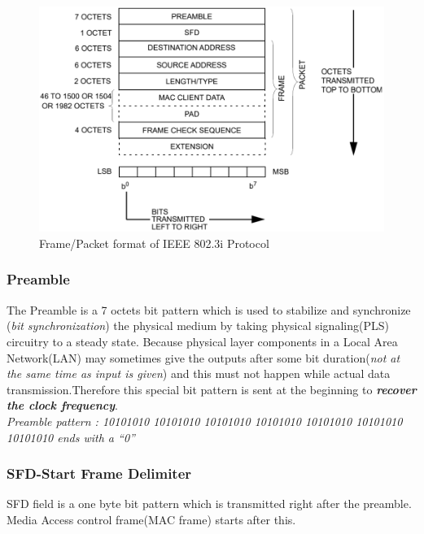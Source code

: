 \documentclass[a4paper,11pt]{article}%
\begin{document}
\begin{figure}[!h]
	\centering
	\includegraphics[scale=0.45]{figures/framformat}
	\caption{Frame/Packet format of IEEE 802.3i Protocol\cite{main}}
\end{figure}







\subsubsection{Preamble}

The Preamble is a 7 octets bit pattern which is used to stabilize and synchronize (\textit{bit synchronization}) the physical medium by taking physical signaling(PLS) circuitry to a steady state. Because physical layer components in a Local Area Network(LAN) may sometimes give the outputs after some bit duration(\textit{not at the same time as input is given}) and this must not happen while  actual data transmission.Therefore this special bit pattern is sent at the beginning to \textbf{\textit{recover the clock frequency}}.\\

\textit{Preamble pattern : 10101010 10101010 10101010 10101010 10101010 10101010 10101010 ends with a ``0''} 

\subsubsection{SFD-Start Frame Delimiter}

SFD field is a one byte bit pattern which is transmitted right after the preamble. Media Access control frame(MAC frame) starts after this.\\
\end{document}
